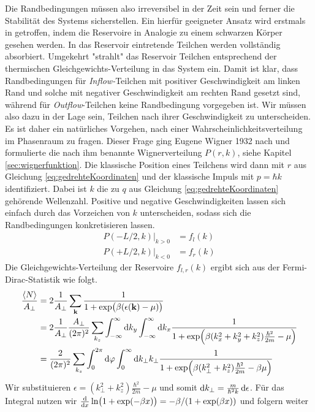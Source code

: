 Die Randbedingungen müssen also irreversibel in der Zeit sein und ferner die Stabilität des Systems sicherstellen. Ein hierfür geeigneter Ansatz wird erstmals in \cite{frensley2} getroffen, indem die Reservoire in Analogie zu einem schwarzen Körper gesehen werden. In das Reservoir eintretende Teilchen werden vollständig absorbiert. Umgekehrt "strahlt" das Reservoir Teilchen entsprechend der thermischen Gleichgewichts-Verteilung in das System ein. Damit ist klar, dass Randbedingungen für \emph{Inflow-}Teilchen mit positiver Geschwindigkeit am linken Rand und solche mit negativer Geschwindigkeit am rechten Rand gesetzt sind, während für \emph{Outflow}-Teilchen keine Randbedingung vorgegeben ist. Wir müssen also dazu in der Lage sein, Teilchen nach ihrer Geschwindigkeit zu unterscheiden.
Es ist daher ein natürliches Vorgehen, nach einer Wahrscheinlichkeitsverteilung im Phasenraum zu fragen. Dieser Frage ging Eugene Wigner 1932 nach \cite{wigner} und formulierte die nach ihm benannte Wignerverteilung $P(r, k)$, siehe Kapitel \ref{sec:wignerfunktion}. Die klassische Position eines Teilchens wird dann mit $r$ aus Gleichung \eqref{eq:gedrehteKoordinaten} und der klassische Impuls mit $p=\hbar k$ identifiziert.
Dabei ist $k$ die zu $q$ aus Gleichung \eqref{eq:gedrehteKoordinaten} gehörende Wellenzahl. Positive und negative Geschwindigkeiten lassen sich einfach durch das Vorzeichen von $k$ unterscheiden, sodass sich die Randbedingungen konkretisieren lassen.
\begin{align}
  P(-L/2,k)|_{k>0} &= f_l(k) \\
  P(+L/2,k)|_{k<0} &= f_r(k)
\end{align}
Die Gleichgewichts-Verteilung der Reservoire $f_{l,r}(k)$ ergibt sich aus der Fermi-Dirac-Statistik wie folgt.
\begin{align}
  \frac{\expval{N}}{A_{\perp}} &= 2\frac{1}{A_{\perp}}\sum_{\vb{k}}\frac{1}{1+\exp(\beta(\epsilon(\vb{k}) - \mu))} \\
    &= 2\frac{1}{A_{\perp}}  \frac{A_{\perp}}{(2\pi)^2} \sum_{k_z}\int_{-\infty}^{\infty} \mathop{}\!\mathrm{d} k_y \int_{-\infty}^{\infty} \mathop{}\!\mathrm{d} k_x \frac{1}{1+\exp(\beta(k_x^2 + k_y^2 + k_z^2)\frac{\hbar^2}{2m} - \mu)} \\
    &= \frac{2}{(2\pi)^2} \sum_{k_z} \int_0^{2\pi} \mathop{}\!\mathrm{d} \varphi \int_0^{\infty} \mathop{}\!\mathrm{d} k_{\perp} k_{\perp} \frac{1}{1+\exp(\beta(k_{\perp}^2 + k_z^2)\frac{\hbar^2}{2m} - \beta \mu)}
\end{align}
Wir substituieren $\epsilon = (k^2_{\perp} + k_z^2)\frac{\hbar^2}{2m} - \mu$ und somit $\mathop{}\!\mathrm{d} k_\perp = \frac{m}{\hbar^2 k}\mathop{}\!\mathrm{d} \epsilon$. Für das Integral nutzen wir $\frac{\mathrm{d}}{\mathrm{d}x}\ln(1+\exp(-\beta x)) = -\beta / (1+\exp(\beta x))$ und folgern weiter
